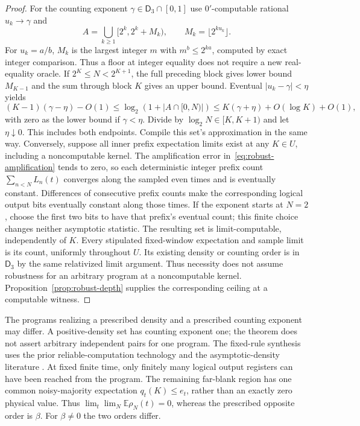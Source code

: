 \begin{proof}
For the counting exponent $\gamma\in\mathsf D_3\cap[0,1]$ use
$0'$-computable rational $u_k\to\gamma$ and
\[
 A=\bigcup_{k\geq1}[2^k,2^k+M_k),\qquad
 M_k=\lfloor2^{ku_k}\rfloor.
\]
For $u_k=a/b$, $M_k$ is the largest integer $m$ with
$m^b\leq2^{ka}$, computed by exact integer comparison. Thus a
floor at integer equality does not require a new real-equality
oracle. If $2^K\leq N<2^{K+1}$, the full preceding block gives
lower bound $M_{K-1}$ and the sum through block $K$ gives an upper
bound. Eventual $|u_k-\gamma|<\eta$ yields
\[
 (K-1)(\gamma-\eta)-O(1)
 \leq\log_2(1+|A\cap[0,N)|)
 \leq K(\gamma+\eta)+O(\log K)+O(1),
\]
with zero as the lower bound if $\gamma<\eta$. Divide by
$\log_2N\in[K,K+1)$ and let $\eta\downarrow0$. This includes
both endpoints. Compile this set's approximation in the same way.
Conversely, suppose all inner prefix expectation limits exist at any
$K\in U$, including a noncomputable kernel. The amplification error
in~\eqref{eq:robust-amplification} tends to zero, so each deterministic
integer prefix count $\sum_{n<N}L_n(t)$ converges along the sampled
even times and is eventually constant. Differences of consecutive
prefix counts make the corresponding logical output bits eventually
constant along those times. If the exponent starts at $N=2$, choose
the first two bits to have that prefix's eventual count; this finite
choice changes neither asymptotic statistic. The resulting set is
limit-computable, independently of $K$. Every stipulated fixed-window
expectation and sample limit is its count, uniformly throughout $U$.
Its existing density or counting order is in
$\mathsf D_3$ by the same relativized limit argument. Thus necessity
does not assume robustness for an arbitrary program at a noncomputable
kernel. Proposition~\ref{prop:robust-depth} supplies the corresponding
ceiling at a computable witness.
\end{proof}
The programs realizing a prescribed density and a prescribed
counting exponent may differ. A positive-density set has counting
exponent one; the theorem does not assert arbitrary independent
pairs for one program. The fixed-rule synthesis uses the prior
reliable-computation technology \cite{toom,gacsReif,thermalTrajectories}
and the asymptotic-density literature \cite{density,ershovDensity}.
At fixed finite time, only finitely many logical output registers can
have been reached from the program. The remaining far-blank region
has one common noisy-majority expectation $q_t(K)\leq e_t$, rather
than an exactly zero physical value. Thus
$\lim_t\lim_N\mathbb E\rho_N(t)=0$, whereas the prescribed
opposite order is $\beta$. For $\beta\ne0$ the two orders differ.

